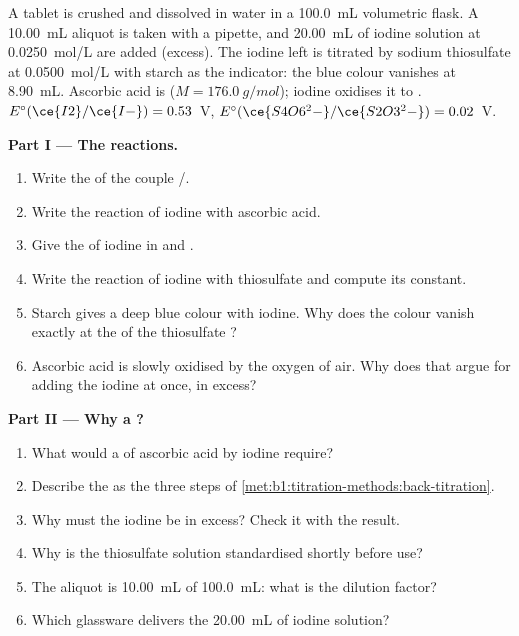 \begin{problem}
\label{pb:b1:titration-methods:1}
A tablet is crushed and dissolved in water in a \qty{100.0}{mL}
volumetric flask. A \qty{10.00}{mL} aliquot is taken with a pipette, and
\qty{20.00}{mL} of iodine solution at \qty{0.0250}{mol/L} are added (excess). The
iodine left is titrated by sodium thiosulfate at \qty{0.0500}{mol/L} with
starch as the indicator: the blue colour vanishes at \qty{8.90}{mL}.
Ascorbic acid is  ($M = \qty{176.0}{g/mol}$); iodine oxidises
it to . $E^\circ(\ce{I2}/\ce{I-}) = 0.53$~V,
$E^\circ(\ce{S4O6^2-}/\ce{S2O3^2-}) = 0.02$~V.

\medskip
\noindent\textbf{Part I --- The reactions.}
\begin{enumerate}
  \item Write the  of the couple /.
  \item Write the reaction of iodine with ascorbic acid.
  \item Give the  of iodine in  and .
  \item Write the reaction of iodine with thiosulfate and compute its
        constant.
  \item Starch gives a deep blue colour with iodine. Why does the colour
        vanish exactly at the  of the thiosulfate ?
  \item Ascorbic acid is slowly oxidised by the oxygen of air. Why does
        that argue for adding the iodine at once, in excess?
\end{enumerate}

\medskip
\noindent\textbf{Part II --- Why a ?}
\begin{enumerate}[resume]
  \item What would a  of ascorbic acid by iodine require?
  \item Describe the  as the three steps of
        \cref{met:b1:titration-methods:back-titration}.
  \item Why must the iodine be in excess? Check it with the result.
  \item Why is the thiosulfate solution standardised shortly before use?
  \item The aliquot is \qty{10.00}{mL} of \qty{100.0}{mL}: what is the
        dilution factor?
  \item Which glassware delivers the \qty{20.00}{mL} of iodine solution?
\end{enumerate}


\end{problem}
